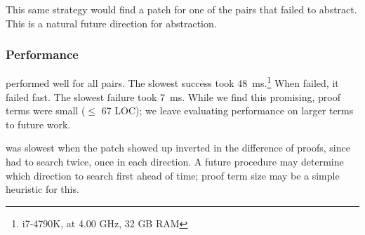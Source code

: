 This same strategy would find a patch for one of the pairs that \sysname failed to 
abstract. %
This is a natural future direction for abstraction.

\subsubsection{Performance}
\label{sec:perf}

\sysname performed well for all pairs. The slowest success took \SI{48}{\ms}.\footnote{i7-4790K, at 4.00 GHz, 32 GB RAM}
When \sysname failed, it failed fast. The slowest failure took \SI{7}{\ms}.
While we find this promising, proof terms were small ($\le$ 67 LOC);
we leave evaluating performance on larger terms
to future work.



\sysname was slowest %
when the patch showed up inverted in the difference of proofs,
since \sysname had to search twice, once in each direction.
A future procedure may %
determine which direction to search first ahead of time; proof term size may be a simple heuristic for this.


